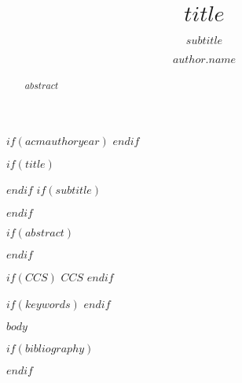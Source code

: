 \documentclass[manuscript,screen,review,anonymous]{acmart}
\author{$author.name$}
\affiliation{
  $if(author.institution)$
  \institution{$author.institution$}
  $endif$
  $if(author.department)$
  \institution{$author.department$}
  $endif$
  $if(author.city)$
  \city{$author.city$}
  $endif$
  $if(author.country)$
  \country{$author.country$}
  $endif$
}
\begin{document}
$if(acmauthoryear)$
$endif$


$if(title)$
  \title{$title$}
$endif$
$if(subtitle)$
  \subtitle{$subtitle$}
$endif$


$if(abstract)$
\begin{abstract}
$abstract$
\end{abstract}
$endif$

\renewcommand{\shortauthors}{$shortauthors$}

\maketitle

$if(CCS)$
$CCS$
$endif$

$if(keywords)$
$endif$


$body$


$if(bibliography)$
  
  
$endif$
\end{document}
